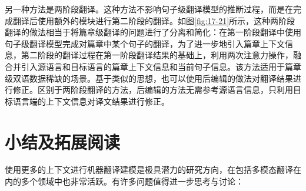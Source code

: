 \parinterval 另一种方法是两阶段翻译。这种方法不影响句子级翻译模型的推断过程，而是在完成翻译后使用额外的模块进行第二阶段的翻译。如图\ref{fig:17-21}所示，这种两阶段翻译的做法相当于将篇章级翻译的问题进行了分离和简化：在第一阶段翻译中使用句子级翻译模型完成对篇章中某个句子的翻译，为了进一步地引入篇章上下文信息，第二阶段的翻译过程在第一阶段翻译结果的基础上，利用两次注意力操作，融合并引入源语言和目标语言的篇章上下文信息和当前句子信息。该方法适用于篇章级双语数据稀缺的场景。基于类似的思想，也可以使用后编辑的做法对翻译结果进行修正。区别于两阶段翻译的方法，后编辑的方法无需参考源语言信息，只利用目标语言端的上下文信息对译文结果进行修正。

\sectionnewpage
\section{小结及拓展阅读}

\parinterval 使用更多的上下文进行机器翻译建模是极具潜力的研究方向，在包括多模态翻译在内的多个领域中也非常活跃。有许多问题值得进一步思考与讨论：

